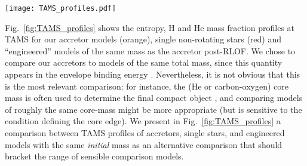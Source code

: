 \documentclass[twocolumn,twocolappendix,trackchanges]{aastex63}
\DeclareRobustCommand{\Eqref}[1]{Eq.~\ref{#1}}
\DeclareRobustCommand{\Figref}[1]{Fig.~\ref{#1}}
\begin{document}
\begin{figure*}[htbp]
  \centering
  \texttt{[image: TAMS\_profiles.pdf]}
  \caption{Specific entropy (top row), H (bottom row, solid lines),
    and He (bottom row, dashed lines) TAMS profiles for non-rotating
    single stars (red), accretors (orange), and ``engineered'' models
    of the same total mass as the post-RLOF mass of the accretors. The
    overlapping gray bands emphasize the CEB region, which is well
    defined at TAMS.}
  \label{fig:TAMS_profiles}
\end{figure*}

\Figref{fig:TAMS_profiles} shows the entropy, H and He mass fraction
profiles at TAMS for our accretor models (orange), single non-rotating
stars (red) and ``engineered'' models of the same mass as the accretor
post-RLOF. We chose to compare our accretors to models of the same
total mass, since this quantity appears in the envelope binding energy
\citep[see \Eqref{eq:BE} and e.g.,][]{dekool:1990, dewi:2000}.
Nevertheless, it is not obvious that this is the most relevant
comparison: for instance, the (He or carbon-oxygen) core mass is often
used to determine the final compact object \citep[e.g.,][]{fryer:2012,
  farmer:2019, patton:2021, renzo:2022, fryer:2022}, and comparing models of roughly the same
core-mass might be more appropriate (but is sensitive to the condition
defining the core edge). We present in
\Figref{fig:TAMS_profiles} a comparison between TAMS
profiles of accretors, single stars, and engineered models with the
same \emph{initial} mass as an alternative comparison that should bracket the
range of sensible comparison models.
\end{document}
